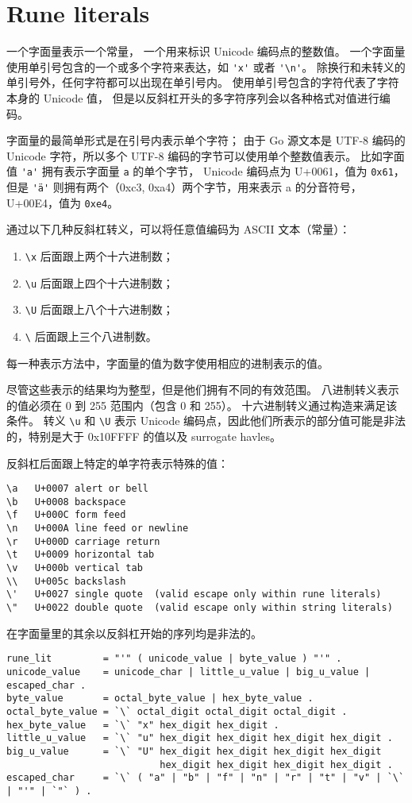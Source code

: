 \section{Rune literals}\label{sec:rune}
一个\rune{}字面量表示一个\rune{}常量，
一个用来标识 Unicode 编码点的整数值。
一个\rune{}字面量使用单引号包含的一个或多个字符来表达，如 \lstinline|'x'| 或者 \lstinline|'\n'|。
除换行和未转义的单引号外，任何字符都可以出现在单引号内。
使用单引号包含的字符代表了字符本身的 Unicode 值，
但是以反斜杠开头的多字符序列会以各种格式对值进行编码。

\rune{}字面量的最简单形式是在引号内表示单个字符；
由于 Go 源文本是 UTF-8 编码的 Unicode 字符，所以多个 UTF-8 编码的字节可以使用单个整数值表示。
比如字面值 \lstinline|'a'| 拥有表示字面量 \lstinline|a| 的单个字节，
Unicode 编码点为 U+0061，值为 \lstinline|0x61|，但是 \lstinline|'ä'| 则拥有两个（0xc3, 0xa4）两个字节，用来表示 a 的分音符号，
U+00E4，值为 \lstinline|0xe4|。

通过以下几种反斜杠转义，可以将任意值编码为 ASCII 文本（\rune 常量）：
\begin{enumerate}
\item \lstinline|\x| 后面跟上两个十六进制数；
\item \lstinline|\u| 后面跟上四个十六进制数；
\item \lstinline|\U| 后面跟上八个十六进制数；
\item \lstinline|\|  后面跟上三个八进制数。
\end{enumerate}
每一种表示方法中，字面量的值为数字使用相应的进制表示的值。

尽管这些表示的结果均为整型，但是他们拥有不同的有效范围。
八进制转义表示的值必须在 0 到 255 范围内（包含 0 和 255）。
十六进制转义通过构造来满足该条件。%
转义 \lstinline|\u| 和 \lstinline|\U| 表示 Unicode 编码点，因此他们所表示的部分值可能是非法的，特别是大于 0x10FFFF 的值以及 surrogate havles。

反斜杠后面跟上特定的单字符表示特殊的值：
\begin{lstlisting}
\a   U+0007 alert or bell
\b   U+0008 backspace
\f   U+000C form feed
\n   U+000A line feed or newline
\r   U+000D carriage return
\t   U+0009 horizontal tab
\v   U+000b vertical tab
\\   U+005c backslash
\'   U+0027 single quote  (valid escape only within rune literals)
\"   U+0022 double quote  (valid escape only within string literals)
\end{lstlisting}

在\rune{}字面量里的其余以反斜杠开始的序列均是非法的。
\begin{lstlisting}[style=EBNF]
rune_lit         = "'" ( unicode_value | byte_value ) "'" .
unicode_value    = unicode_char | little_u_value | big_u_value | escaped_char .
byte_value       = octal_byte_value | hex_byte_value .
octal_byte_value = `\` octal_digit octal_digit octal_digit .
hex_byte_value   = `\` "x" hex_digit hex_digit .
little_u_value   = `\` "u" hex_digit hex_digit hex_digit hex_digit .
big_u_value      = `\` "U" hex_digit hex_digit hex_digit hex_digit
                           hex_digit hex_digit hex_digit hex_digit .
escaped_char     = `\` ( "a" | "b" | "f" | "n" | "r" | "t" | "v" | `\` | "'" | `"` ) .
\end{lstlisting}

